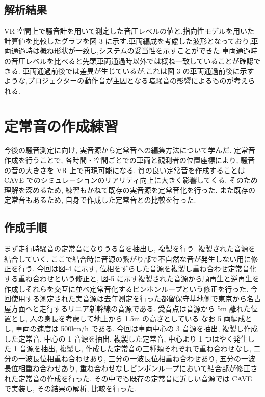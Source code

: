 \documentclass[10pt]{jsarticle}
\begin{document}
\subsection{解析結果}
VR 空間上で騒音計を用いて測定した音圧レベルの値と,指向性モデルを用いた計算値を比較したグラフを図-3 に示す.車両編成を考慮した波形となっており,車両通過時は概ね形状が一致し,システムの妥当性を示すことができた.車両通過時の音圧レベルを比べると先頭車両通過時以外では概ね一致していることが確認できる. 車両通過前後では差異が生じているが,これは図-3 の車両通過前後に示すような,プロジェクターの動作音が主因となる暗騒音の影響によるものが考えられる.


\section{定常音の作成練習}
今後の騒音測定に向け, 実音源から定常音への編集方法について学んだ. 定常音作成を行うことで, 各時間・空間ごとでの車両と観測者の位置座標により, 騒音の音の大きさを VR 上で再現可能になる. 質の良い定常音を作成することは CAVE でのシミュレーションのリアリティ向上に大きく影響してくる. そのため理解を深めるため, 練習もかねて既存の実音源を定常音化を行った. また既存の定常音もあるため, 自身で作成した定常音との比較を行った.

\subsection{作成手順}
まず走行時騒音の定常音になりうる音を抽出し, 複製を行う. 複製された音源を結合していく. ここで結合時に音源の繋がり部で不自然な音が発生しない用に修正を行う. 今回は図-4 に示す, 位相をずらした音源を複製し重ね合わせ定常音化する重ね合わせという修正と, 図-5 に示す複製された音源から順再生と逆再生を作成しそれらを交互に並べ定常音化するピンポンループという修正を行った. 今回使用する測定された実音源は去年測定を行った都留保守基地側で東京から名古屋方面へと走行するリニア新幹線の音源である. 受音点は音源から 5m 離れた位置とし, 人の身長を考慮して地上から 1.5m の高さとしている.なお 5 両編成とし, 車両の速度は 500km/h である. 今回は車両中心の 3 音源を抽出, 複製し作成した定常音, 中心の 1 音源を抽出, 複製した定常音, 中心より 1 つはやく発生した 1 音源を抽出, 複製し, 作成した定常音の三種類それぞれで重ね合わせなし, 二分の一波長位相重ね合わせあり, 三分の一波長位相重ね合わせあり, 五分の一波長位相重ね合わせあり, 重ね合わせなしピンポンループにおいて結合部が修正された定常音の作成を行った. その中でも既存の定常音に近しい音源では CAVE で実装し, その結果の解析, 比較を行った.
\end{document}
